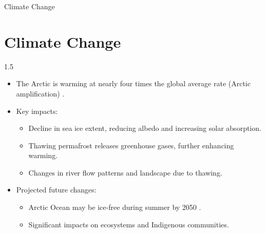 \begin{frame}{Climate Change}
    \section{Climate Change}
    \begin{spacing}{1.5} 
\begin{itemize}

    \item The Arctic is warming at nearly four times the global average rate (Arctic amplification) \citep{rantanen2022}.
    \item Key impacts:
    \begin{itemize}
      \item Decline in sea ice extent, reducing albedo and increasing solar absorption.
      \item Thawing permafrost releases greenhouse gases, further enhancing warming.
      \item Changes in river flow patterns and landscape due to thawing.
    \end{itemize}
    \item Projected future changes:
    \begin{itemize}
      \item Arctic Ocean may be ice-free during summer by 2050 \citep{hartmann2016}.
      \item Significant impacts on ecosystems and Indigenous communities.
    \end{itemize}

  \end{itemize}
  \end{spacing}
\end{frame}


